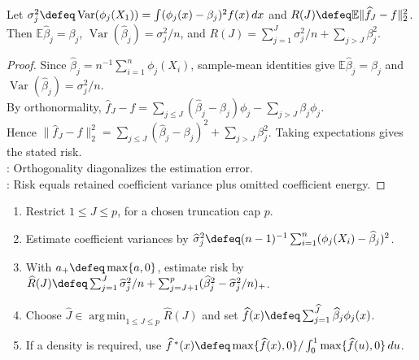 \begin{theorem} \label{thm:orthogonal-density-coefficient-moments-and-risk} \\
Let $\sigma_j^2\defeq\operatorname{Var}(\phi_j(X_1))=\int(\phi_j(x)-\beta_j)^2f(x)\,dx$ and $R(J)\defeq\mathbb{E}\|\widehat f_J-f\|_2^2$.\\
Then $\mathbb{E}\widehat\beta_j=\beta_j$, $\operatorname{Var}(\widehat\beta_j)=\sigma_j^2/n$, and $R(J)=\sum_{j=1}^{J}\sigma_j^2/n+\sum_{j>J}\beta_j^2$.
\begin{proof} Since $\widehat\beta_j=n^{-1}\sum_{i=1}^{n}\phi_j(X_i)$, sample-mean identities give $\mathbb{E}\widehat\beta_j=\beta_j$ and $\operatorname{Var}(\widehat\beta_j)=\sigma_j^2/n$.\\
By orthonormality, $\widehat f_J-f=\sum_{j\leq J}(\widehat\beta_j-\beta_j)\phi_j-\sum_{j>J}\beta_j\phi_j$.\\
Hence $\|\widehat f_J-f\|_2^2=\sum_{j\leq J}(\widehat\beta_j-\beta_j)^2+\sum_{j>J}\beta_j^2$. Taking expectations gives the stated risk.\\
: Orthogonality diagonalizes the estimation error.\\
: Risk equals retained coefficient variance plus omitted coefficient energy.
\end{proof}
\end{theorem}

\begin{method} \label{meth:orthogonal-density-risk-estimation} 
\begin{enumerate}[label=(\roman*)]
\setlength{\itemsep}{0pt}
\item Restrict $1\leq J\leq p$, for a chosen truncation cap $p$.
\item Estimate coefficient variances by $\widehat\sigma_j^2\defeq(n-1)^{-1}\sum_{i=1}^{n}(\phi_j(X_i)-\widehat\beta_j)^2$.
\item With $a_+\defeq\max\{a,0\}$, estimate risk by $\widehat R(J)\defeq\sum_{j=1}^{J}\widehat\sigma_j^2/n+\sum_{j=J+1}^{p}(\widehat\beta_j^2-\widehat\sigma_j^2/n)_+$.
\item Choose $\widehat J\in\operatorname*{arg\,min}_{1\leq J\leq p}\widehat R(J)$ and set $\widehat f(x)\defeq\sum_{j=1}^{\widehat J}\widehat\beta_j\phi_j(x)$.
\item If a density is required, use $\widehat f^{\,*}(x)\defeq\max\{\widehat f(x),0\}/\int_0^1\max\{\widehat f(u),0\}\,du$.
\end{enumerate}
\end{method}

